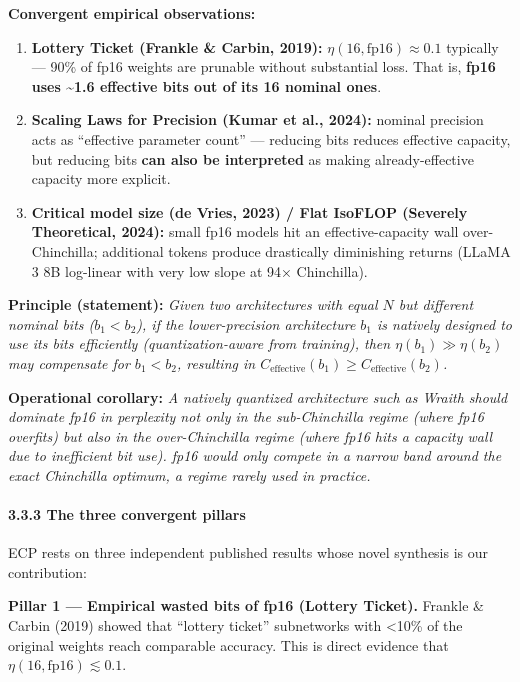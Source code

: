 \textbf{Convergent empirical observations:}

\begin{enumerate}
\def\labelenumi{\arabic{enumi}.}
\item
  \textbf{Lottery Ticket (Frankle \& Carbin, 2019):}
  \(\eta(16, \text{fp16}) \approx 0.1\) typically --- 90\% of fp16
  weights are prunable without substantial loss. That is, \textbf{fp16
  uses \textasciitilde1.6 effective bits out of its 16 nominal ones}.
\item
  \textbf{Scaling Laws for Precision (Kumar et al., 2024):} nominal
  precision acts as ``effective parameter count'' --- reducing bits
  reduces effective capacity, but reducing bits \textbf{can also be
  interpreted} as making already-effective capacity more explicit.
\item
  \textbf{Critical model size (de Vries, 2023) / Flat IsoFLOP (Severely
  Theoretical, 2024):} small fp16 models hit an effective-capacity wall
  over-Chinchilla; additional tokens produce drastically diminishing
  returns (LLaMA 3 8B log-linear with very low slope at 94× Chinchilla).
\end{enumerate}

\textbf{Principle (statement):} \emph{Given two architectures with equal
\(N\) but different nominal bits (\(b_1 < b_2\)), if the lower-precision
architecture \(b_1\) is natively designed to use its bits efficiently
(quantization-aware from training), then \(\eta(b_1) \gg \eta(b_2)\) may
compensate for \(b_1 < b_2\), resulting in
\(C_\text{effective}(b_1) \geq C_\text{effective}(b_2)\).}

\textbf{Operational corollary:} \emph{A natively quantized architecture
such as Wraith should dominate fp16 in perplexity not only in the
sub-Chinchilla regime (where fp16 overfits) but also in the
over-Chinchilla regime (where fp16 hits a capacity wall due to
inefficient bit use). fp16 would only compete in a narrow band around
the exact Chinchilla optimum, a regime rarely used in practice.}

\paragraph{3.3.3 The three convergent
pillars}\label{the-three-convergent-pillars}

ECP rests on three independent published results whose novel synthesis
is our contribution:

\textbf{Pillar 1 --- Empirical wasted bits of fp16 (Lottery Ticket).}
Frankle \& Carbin (2019) showed that ``lottery ticket'' subnetworks with
\textless10\% of the original weights reach comparable accuracy. This is
direct evidence that \(\eta(16, \text{fp16}) \lesssim 0.1\).

